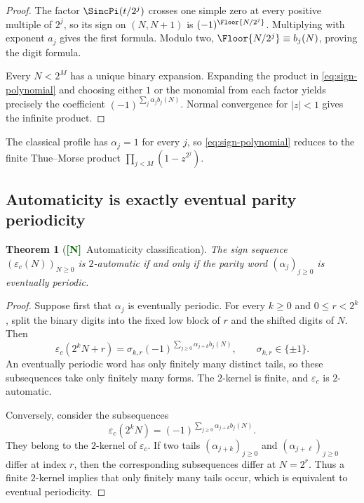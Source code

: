 \documentclass[11pt]{article}
\numberwithin{equation}{section}
\newtheorem{theorem}{Theorem}[section]
\theoremstyle{definition}
\theoremstyle{remark}
\newcommand{\New}{\textcolor{darkgreen}{\textsf{\textbf{[N]}}}}
\begin{document}
\begin{proof}
The factor $\SincPi(t/2^j)$ crosses one simple zero at every positive multiple
of $2^j$, so its sign on $(N,N+1)$ is
$(-1)^{\Floor{N/2^j}}$.  Multiplying with exponent $a_j$ gives the first
formula.  Modulo two,
$\Floor{N/2^j}\equiv b_j(N)$, proving the digit formula.

Every $N<2^M$ has a unique binary expansion.  Expanding the product in
\eqref{eq:sign-polynomial} and choosing either $1$ or the monomial from each
factor yields precisely the coefficient
$(-1)^{\sum_j\alpha_jb_j(N)}$.  Normal convergence for $|z|<1$ gives the
infinite product.
\end{proof}

The classical profile has $\alpha_j=1$ for every $j$, so
\eqref{eq:sign-polynomial} reduces to the finite Thue--Morse product
$\prod_{j<M}(1-z^{2^j})$.

\subsection{Automaticity is exactly eventual parity periodicity}

\begin{theorem}[\New\ Automaticity classification]
\label{thm:automaticity}
The sign sequence $(\varepsilon_c(N))_{N\ge0}$ is $2$-automatic if and only if
the parity word $(\alpha_j)_{j\ge0}$ is eventually periodic.
\end{theorem}

\begin{proof}
Suppose first that $\alpha_j$ is eventually periodic.  For every $k\ge0$ and
$0\le r<2^k$, split the binary digits into the fixed low block of $r$ and the
shifted digits of $N$.  Then
\[
 \varepsilon_c(2^kN+r)=\sigma_{k,r}
 (-1)^{\sum_{j\ge0}\alpha_{j+k}b_j(N)},
 \qquad \sigma_{k,r}\in\{\pm1\}.
\]
An eventually periodic word has only finitely many distinct tails, so these
subsequences take only finitely many forms.  The $2$-kernel is finite, and
$\varepsilon_c$ is $2$-automatic.

Conversely, consider the subsequences
\[
 \varepsilon_c(2^kN)
 =(-1)^{\sum_{j\ge0}\alpha_{j+k}b_j(N)}.
\]
They belong to the $2$-kernel of $\varepsilon_c$.  If two tails
$(\alpha_{j+k})_{j\ge0}$ and $(\alpha_{j+\ell})_{j\ge0}$ differ at index $r$,
then the corresponding subsequences differ at $N=2^r$.  Thus a finite
$2$-kernel implies that only finitely many tails occur, which is equivalent to
eventual periodicity.
\end{proof}
\end{document}

